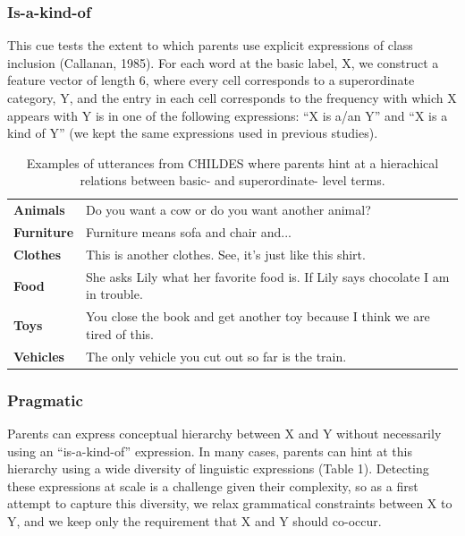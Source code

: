 \documentclass[english,,man,floatsintext]{apa6}
\begin{document}
\hypertarget{is-a-kind-of}{%
\subsubsection{Is-a-kind-of}\label{is-a-kind-of}}

This cue tests the extent to which parents use explicit expressions of class inclusion (Callanan, 1985). For each word at the basic label, X,
we construct a feature vector of length 6, where every cell corresponds to a superordinate category, Y, and the entry in each cell corresponds to the frequency with which X appears with Y is in one of the following expressions: \enquote{X is a/an Y} and \enquote{X is a kind of Y} (we kept the same expressions used in previous studies).

\begin{table}[!htbp] \centering 
\begin{tabular}{l p{}}
\hline

\textbf{Animals} & Do you want a cow or do you want another animal?\\

\textbf{Furniture} & Furniture means sofa and chair and...\\

\textbf{Clothes} & This is another clothes. See, it's just like this shirt.\\

\textbf{Food}   & She asks Lily what her favorite food is. If Lily says chocolate I am in trouble. \\

\textbf{Toys} & You close the book and get another toy because I think we are tired of this.\\

\textbf{Vehicles} & The only vehicle you cut out so far is the train.\\

\hline
\end{tabular}
\caption{\label{tab:pragmatic} Examples of utterances from CHILDES where parents hint at a hierachical relations between basic- and superordinate- level terms.}
\end{table}

\hypertarget{pragmatic}{%
\subsubsection{Pragmatic}\label{pragmatic}}

Parents can express conceptual hierarchy between X and Y without
necessarily using an \enquote{is-a-kind-of} expression. In many cases, parents
can hint at this hierarchy using a wide diversity of
linguistic expressions (Table 1). Detecting these expressions at scale is a challenge given their complexity, so as a first attempt to capture this diversity, we relax
grammatical constraints between X to Y, and we keep only the requirement
that X and Y should co-occur.
\end{document}
